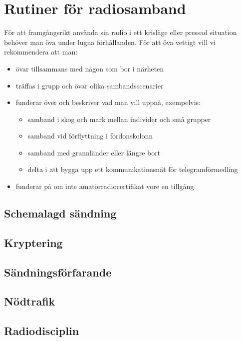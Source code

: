 \chapter{Rutiner för radiosamband}

För att framgångsrikt använda sin radio i ett krisläge eller pressad situation behöver man öva under lugna förhållanden. För att öva vettigt vill vi rekommendera att man:

\begin{itemize}
	\item övar tillsammans med någon som bor i närheten 
	\item träffas i grupp och övar olika sambandsscenarier
	\item funderar över och beskriver vad man vill uppnå, exempelvis:
	\begin{itemize}
		\item samband i skog och mark mellan individer och små grupper
		\item samband vid förflyttning i fordonskolonn
		\item samband med grannländer eller längre bort
		\item delta i att bygga upp ett kommunikationsnät för telegramförmedling
	\end{itemize}
	\item funderar på om inte amatörradiocertifikat vore en tillgång
\end{itemize}

\section{Schemalagd sändning}

\section{Kryptering}

\section{Sändningsförfarande}

\section{Nödtrafik}

\section{Radiodisciplin}

